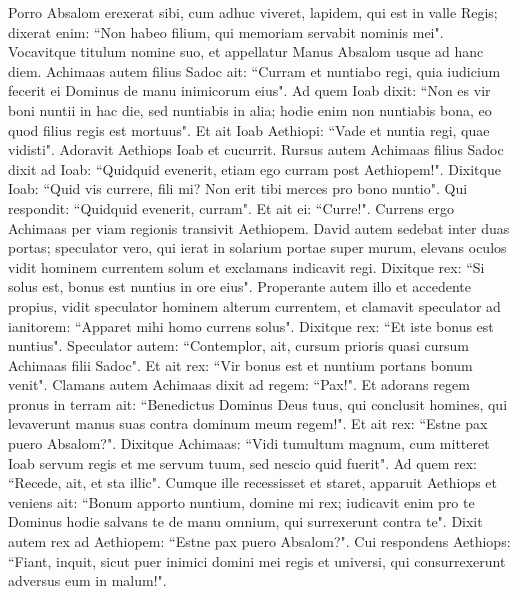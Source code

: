 \begin{biblechapter}
\verse Porro Absalom erexerat sibi, cum adhuc viveret, lapidem, qui est in valle Regis; dixerat enim: “Non habeo filium, qui memoriam servabit nominis mei". Vocavitque titulum nomine suo, et appellatur Manus Absalom usque ad hanc diem. 
\verse Achimaas autem filius Sadoc ait: “Curram et nuntiabo regi, quia iudicium fecerit ei Dominus de manu inimicorum eius". 
\verse Ad quem Ioab dixit: “Non es vir boni nuntii in hac die, sed nuntiabis in alia; hodie enim non nuntiabis bona, eo quod filius regis est mortuus". 
\verse Et ait Ioab Aethiopi: “Vade et nuntia regi, quae vidisti". Adoravit Aethiops Ioab et cucurrit. 
\verse Rursus autem Achimaas filius Sadoc dixit ad Ioab: “Quidquid evenerit, etiam ego curram post Aethiopem!". Dixitque Ioab: “Quid vis currere, fili mi? Non erit tibi merces pro bono nuntio". 
\verse Qui respondit: “Quidquid evenerit, curram". Et ait ei: “Curre!". Currens ergo Achimaas per viam regionis transivit Aethiopem. 
\verse David autem sedebat inter duas portas; speculator vero, qui ierat in solarium portae super murum, elevans oculos vidit hominem currentem solum 
\verse et exclamans indicavit regi. Dixitque rex: “Si solus est, bonus est nuntius in ore eius". Properante autem illo et accedente propius, 
\verse vidit speculator hominem alterum currentem, et clamavit speculator ad ianitorem: “Apparet mihi homo currens solus". Dixitque rex: “Et iste bonus est nuntius". 
\verse Speculator autem: “Contemplor, ait, cursum prioris quasi cursum Achimaas filii Sadoc". Et ait rex: “Vir bonus est et nuntium portans bonum venit". 
\verse Clamans autem Achimaas dixit ad regem: “Pax!". Et adorans regem pronus in terram ait: “Benedictus Dominus Deus tuus, qui conclusit homines, qui levaverunt manus suas contra dominum meum regem!". 
\verse Et ait rex: “Estne pax puero Absalom?". Dixitque Achimaas: “Vidi tumultum magnum, cum mitteret Ioab servum regis et me servum tuum, sed nescio quid fuerit". 
\verse Ad quem rex: “Recede, ait, et sta illic". Cumque ille recessisset et staret, 
\verse apparuit Aethiops et veniens ait: “Bonum apporto nuntium, domine mi rex; iudicavit enim pro te Dominus hodie salvans te de manu omnium, qui surrexerunt contra te". 
\verse Dixit autem rex ad Aethiopem: “Estne pax puero Absalom?". Cui respondens Aethiops: “Fiant, inquit, sicut puer inimici domini mei regis et universi, qui consurrexerunt adversus eum in malum!". 
\end{biblechapter}

